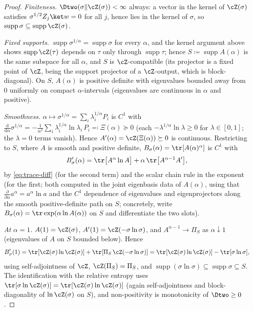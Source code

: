 \begin{proof}
\emph{Finiteness.} $\Dtwo(\sigma\|\cZ(\sigma))<\infty$ always: a vector
in the kernel of $\cZ(\sigma)$ satisfies $\sigma^{1/2}Z_j\ket w=0$ for all
$j$, hence lies in the kernel of $\sigma$, so
$\operatorname{supp}\sigma\subseteq\operatorname{supp}\cZ(\sigma)$.

\emph{Fixed supports.} $\operatorname{supp}\sigma^{1/\alpha}
=\operatorname{supp}\sigma$ for every $\alpha$, and the kernel argument
above shows $\operatorname{supp}\cZ(\tau)$ depends on $\tau$ only through
$\operatorname{supp}\tau$; hence
$S\coloneqq\operatorname{supp}A(\alpha)$ is the same subspace for all
$\alpha$, and $S$ is $\cZ$-compatible (its projector is a fixed point of
$\cZ$, being the support projector of a $\cZ$-output, which is
block-diagonal). On $S$, $A(\alpha)$ is positive definite with
eigenvalues bounded away from $0$ uniformly on compact
$\alpha$-intervals (eigenvalues are continuous in $\alpha$ and positive).

\emph{Smoothness.} $\alpha\mapsto\sigma^{1/\alpha}
=\sum_i\lambda_i^{1/\alpha}P_i$ is $C^{1}$ with
$\frac{\mathrm d}{\mathrm d\alpha}\sigma^{1/\alpha}
=-\frac1{\alpha^{2}}\sum_i\lambda_i^{1/\alpha}\ln\lambda_i\,P_i
\eqqcolon\Xi(\alpha)\succeq0$ (each $-\lambda^{1/\alpha}\ln\lambda\ge0$
for $\lambda\in[0,1]$; the $\lambda=0$ terms vanish). Hence
$A'(\alpha)=\cZ(\Xi(\alpha))\succeq0$ is continuous. Restricting to
$S$, where $A$ is smooth and positive definite,
$B_{\sigma}(\alpha)=\tr[A(\alpha)^{\alpha}]$ is $C^1$ with
\begin{equation}\label{eq:Bprime-general}
  B_{\sigma}'(\alpha)
  =\tr\big[A^{\alpha}\ln A\big]
  +\alpha\,\tr\big[A^{\alpha-1}A'\big],
\end{equation}
by \eqref{eq:trace-diff} (for the second term) and the scalar chain rule
in the exponent (for the first; both computed in the joint eigenbasis
data of $A(\alpha)$, using that
$\frac{\partial}{\partial\alpha}a^{\alpha}=a^{\alpha}\ln a$ and the
$C^1$ dependence of eigenvalues and eigenprojectors along the smooth
positive-definite path on $S$; concretely, write
$B_{\sigma}(\alpha)=\tr\exp(\alpha\ln A(\alpha))$ on $S$ and
differentiate the two slots).

\emph{At $\alpha=1$.} $A(1)=\cZ(\sigma)$,
$A'(1)=\cZ(-\sigma\ln\sigma)$, and $A^{\alpha-1}\to\Pi_S$ as
$\alpha\downarrow1$ (eigenvalues of $A$ on $S$ bounded below). Hence
\begin{equation*}
  B_{\sigma}'(1)=\tr[\cZ(\sigma)\ln\cZ(\sigma)]
  +\tr[\Pi_S\,\cZ(-\sigma\ln\sigma)]
  =\tr[\cZ(\sigma)\ln\cZ(\sigma)]-\tr[\sigma\ln\sigma],
\end{equation*}
using self-adjointness of $\cZ$, $\cZ(\Pi_S)=\Pi_S$, and
$\operatorname{supp}(\sigma\ln\sigma)\subseteq\operatorname{supp}\sigma
\subseteq S$. The identification with the relative entropy uses
$\tr[\sigma\ln\cZ(\sigma)]=\tr[\cZ(\sigma)\ln\cZ(\sigma)]$ (again
self-adjointness and block-diagonality of $\ln\cZ(\sigma)$ on $S$), and
non-positivity is monotonicity of $\Dtwo\ge0$.


\end{proof}
